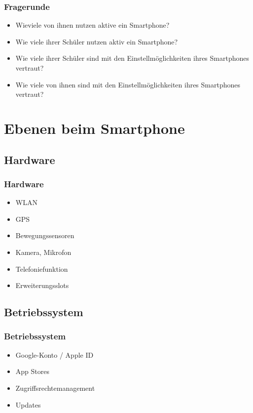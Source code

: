 \documentclass[12pt]{beamer}
\begin{document}
\begin{frame}
    \frametitle{Fragerunde}
    \begin{itemize}
	    \item<2-> Wieviele von ihnen nutzen aktive ein Smartphone?
	    \item<3-> Wie viele ihrer Schüler nutzen aktiv ein Smartphone?
	    \item<4-> Wie viele ihrer Schüler sind mit den Einstellmöglichkeiten ihres Smartphones vertraut?
	    \item<5-> Wie viele von ihnen sind mit den Einstellmöglichkeiten ihres Smartphones vertraut?
    \end{itemize}
\end{frame}

\section{Ebenen beim Smartphone}
\subsection{Hardware}
\begin{frame}
	\frametitle{Hardware}
	\begin{itemize}
		\item<2-> WLAN
		\item<3-> GPS
		\item<4-> Bewegungssensoren
		\item<5-> Kamera, Mikrofon
		\item<6-> Telefoniefunktion
		\item<7-> Erweiterungsslots
	\end{itemize}
\end{frame}

\subsection{Betriebssystem}
\begin{frame}
	\frametitle{Betriebssystem}
	\begin{itemize}
		\item<2-> Google-Konto / Apple ID
		\item<3-> App Stores
		\item<4-> Zugriffsrechtemanagement
		\item<5-> Updates
	\end{itemize}
\end{frame}
\end{document}
